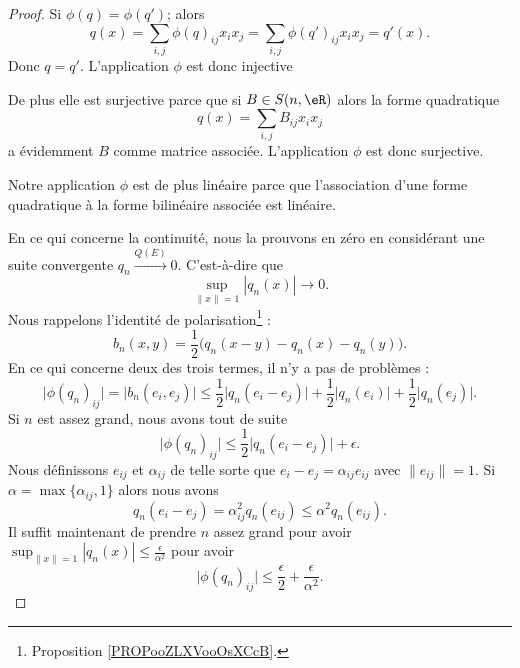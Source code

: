 \begin{proof}
	Si \( \phi(q)=\phi(q')\); alors
	\begin{equation}
		q(x)=\sum_{i,j}\phi(q)_{ij}x_ix_j=\sum_{i,j}\phi(q')_{ij}x_ix_j=q'(x).
	\end{equation}
	Donc \( q=q'\). L'application \( \phi\) est donc injective

	De plus elle est surjective parce que si \( B\in S(n,\eR)\) alors la forme quadratique
	\begin{equation}
		q(x)=\sum_{i,j}B_{ij}x_ix_j
	\end{equation}
	a évidemment \( B\) comme matrice associée. L'application \( \phi\) est donc surjective.

	Notre application \( \phi\) est de plus linéaire parce que l'association d'une forme quadratique à la forme bilinéaire associée est linéaire.

	En ce qui concerne la continuité, nous la prouvons en zéro en considérant une suite convergente \( q_n\stackrel{Q(E)}{\longrightarrow}0\). C'est-à-dire que
	\begin{equation}
		\sup_{\| x \|=1}| q_n(x) |\to 0.
	\end{equation}
	Nous rappelons l'identité de polarisation\footnote{Proposition \ref{PROPooZLXVooOsXCcB}.} :
	\begin{equation}
		b_n(x,y)=\frac{ 1 }{2}\big( q_n(x-y)-q_n(x)-q_n(y) \big).
	\end{equation}
	En ce qui concerne deux des trois termes, il n'y a pas de problèmes :
	\begin{equation}
		\big| \phi(q_n)_{ij} \big|=\big| b_n(e_i,e_j) \big|\leq\frac{ 1 }{2}\big| q_n(e_i-e_j) \big|+\frac{ 1 }{2}\big| q_n(e_i) \big|+\frac{ 1 }{2}\big| q_n(e_j) \big|.
	\end{equation}
	Si \( n\) est assez grand, nous avons tout de suite
	\begin{equation}
		\big| \phi(q_n)_{ij} \big|\leq \frac{ 1 }{2}\big| q_n(e_i-e_j) \big|+\epsilon.
	\end{equation}
	Nous définissons \( e_{ij}\) et \( \alpha_{ij}\) de telle sorte que \( e_i-e_j=\alpha_{ij}e_{ij}\) avec \( \| e_{ij} \|=1\). Si \( \alpha=\max\{ \alpha_{ij},1 \}\) alors nous avons
	\begin{equation}
		q_n(e_i-e_j)=\alpha_{ij}^2q_n(e_{ij})\leq \alpha^2q_n(e_{ij}).
	\end{equation}
	Il suffit maintenant de prendre \( n\) assez grand pour avoir \( \sup_{\| x \|=1}| q_n(x) |\leq \frac{ \epsilon }{ \alpha^2 }\) pour avoir
	\begin{equation}
		\big| \phi(q_n)_{ij} \big|\leq \frac{ \epsilon }{2}+\frac{ \epsilon }{ \alpha^2 }.
	\end{equation}
\end{proof}


